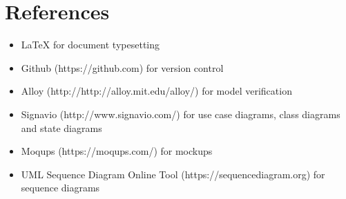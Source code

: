 \chapter{References}
		\begin{itemize}
			\item \LaTeX {  for document typesetting}
			\item Github (https://github.com) for version control
			\item Alloy (http://http://alloy.mit.edu/alloy/) for model verification
			\item Signavio (http://www.signavio.com/) for use case diagrams, class diagrams and state diagrams
			\item Moqups (https://moqups.com/) for mockups
			\item UML Sequence Diagram Online Tool (https://sequencediagram.org) for sequence diagrams
		\end{itemize}
					
	